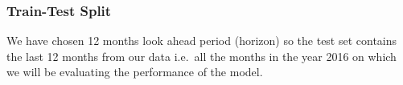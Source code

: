 \documentclass[11pt,oneside,a4paper]{reedthesis}
\newenvironment{Shaded}{\begin{snugshade}}{\end{snugshade}}
\newcommand{\KeywordTok}[1]{\textcolor[rgb]{0.13,0.29,0.53}{\textbf{#1}}}
\newcommand{\DataTypeTok}[1]{\textcolor[rgb]{0.13,0.29,0.53}{#1}}
\newcommand{\DecValTok}[1]{\textcolor[rgb]{0.00,0.00,0.81}{#1}}
\newcommand{\StringTok}[1]{\textcolor[rgb]{0.31,0.60,0.02}{#1}}
\newcommand{\CommentTok}[1]{\textcolor[rgb]{0.56,0.35,0.01}{\textit{#1}}}
\newcommand{\OperatorTok}[1]{\textcolor[rgb]{0.81,0.36,0.00}{\textbf{#1}}}
\newcommand{\NormalTok}[1]{#1}
\begin{document}
\subsubsection{Train-Test Split}\label{train-test-split}
\begin{Shaded}
\end{Shaded}
We have chosen 12 months look ahead period (horizon) so the test set
contains the last 12 months from our data i.e.~all the months in the
year 2016 on which we will be evaluating the performance of the model.

\pagebreak
\end{document}
